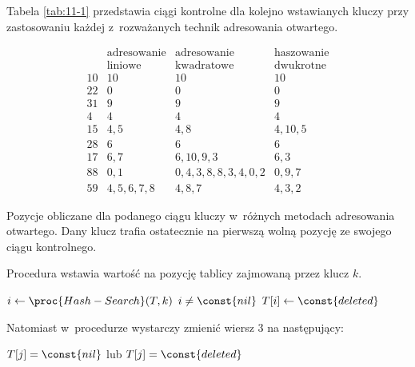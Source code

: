 
\exercise %

\noindent Tabela \ref{tab:11-1} przedstawia ciągi kontrolne dla kolejno wstawianych kluczy przy zastosowaniu każdej z~rozważanych technik adresowania otwartego.

\begin{table}[!ht]
	\centering
		\[
			\begin{array}{c|c|c|c}
				& \text{adresowanie} & \text{adresowanie} & \text{haszowanie} \\
				& \text{liniowe} & \text{kwadratowe} & \text{dwukrotne} \\
				\hline
				10 & 10 & 10 & 10 \\
				\hline
				22 & 0 & 0 & 0 \\
				\hline
				31 & 9 & 9 & 9 \\
				\hline
				4 & 4 & 4 & 4 \\
				\hline
				15 & 4,5 & 4,8 & 4,10,5 \\
				\hline
				28 & 6 & 6 & 6 \\
				\hline
				17 & 6,7 & 6,10,9,3 & 6,3 \\
				\hline
				88 & 0,1 & 0,4,3,8,8,3,4,0,2 & 0,9,7 \\
				\hline
				59 & 4,5,6,7,8 & 4,8,7 & 4,3,2
			\end{array}
		\]
	\caption{Pozycje obliczane dla podanego ciągu kluczy w~różnych metodach adresowania otwartego.
Dany klucz trafia ostatecznie na pierwszą wolną pozycję ze swojego ciągu kontrolnego.} \label{tab:11-1}
\end{table}

\exercise %
Procedura  wstawia wartość  na pozycję tablicy zajmowaną przez klucz $k$.
\begin{codebox}
\li	$i\gets\proc{Hash-Search}(T,k)$
\li	\If $i\ne\const{nil}$
\li		\Then $T[i]\gets\const{deleted}$
		\End
\end{codebox}
Natomiast w~procedurze  wystarczy zmienić wiersz 3 na następujący:
\begin{codebox}
\setcounter{codelinenumber}{2}
\li	\If $T[j]=\const{nil}$ lub $T[j]=\const{deleted}$
\end{codebox}

